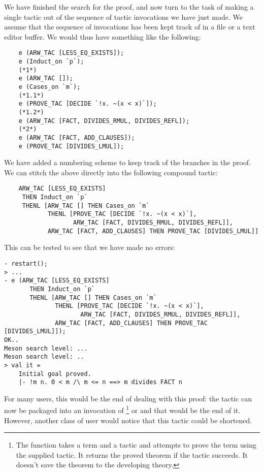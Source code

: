 We have finished the search for the proof, and now turn to the task of
making a single tactic out of the sequence of tactic invocations we have
just made. We assume that the sequence of invocations has been kept
track of in a file or a text editor buffer. We would thus have something
like the following:
{\small \begin{verbatim}
    e (ARW_TAC [LESS_EQ_EXISTS]);
    e (Induct_on `p`);
    (*1*)
    e (ARW_TAC []);
    e (Cases_on `m`);
    (*1.1*)
    e (PROVE_TAC [DECIDE `!x. ~(x < x)`]);
    (*1.2*)
    e (ARW_TAC [FACT, DIVIDES_RMUL, DIVIDES_REFL]);
    (*2*)
    e (ARW_TAC [FACT, ADD_CLAUSES]);
    e (PROVE_TAC [DIVIDES_LMUL]);
\end{verbatim}}
\noindent

We have added a numbering scheme to keep track of the branches in the
proof. We can stitch the above directly into the following compound
tactic:

{\small\begin{verbatim}
    ARW_TAC [LESS_EQ_EXISTS]
     THEN Induct_on `p`
     THENL [ARW_TAC [] THEN Cases_on `m`
            THENL [PROVE_TAC [DECIDE `!x. ~(x < x)`],
                   ARW_TAC [FACT, DIVIDES_RMUL, DIVIDES_REFL]],
            ARW_TAC [FACT, ADD_CLAUSES] THEN PROVE_TAC [DIVIDES_LMUL]]
\end{verbatim}}

\noindent This can be tested to see that we have made no errors:

\begin{session}\begin{verbatim}
- restart();
> ...
- e (ARW_TAC [LESS_EQ_EXISTS]
       THEN Induct_on `p`
       THENL [ARW_TAC [] THEN Cases_on `m`
              THENL [PROVE_TAC [DECIDE `!x. ~(x < x)`],
                     ARW_TAC [FACT, DIVIDES_RMUL, DIVIDES_REFL]],
              ARW_TAC [FACT, ADD_CLAUSES] THEN PROVE_TAC [DIVIDES_LMUL]]);
OK..
Meson search level: ...
Meson search level: ..
> val it =
    Initial goal proved.
    |- !m n. 0 < m /\ m <= n ==> m divides FACT n
\end{verbatim}\end{session}
    For many users, this would be the end of dealing with this proof:
    the tactic can now be packaged into an invocation of
    \footnote{The  function takes a term and a
      tactic and attempts to prove the term using the supplied tactic.
      It returns the proved theorem if the tactic succeeds.  It
      doesn't save the theorem to the developing theory.} or
     and that would be the end of it. However, another
    class of user would notice that this tactic could be shortened.

